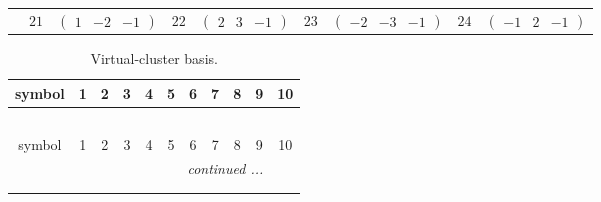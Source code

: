 \documentclass[fleqn,10pt,landscape]{article}
\begin{document}
\begin{itemize}
{\begin{center}
\begin{longtable}{ccccccccc}
& $ 21 $ & $ \begin{pmatrix} 1 & -2 & -1 \end{pmatrix} $ & $ 22 $ & $ \begin{pmatrix} 2 & 3 & -1 \end{pmatrix} $ & $ 23 $ & $ \begin{pmatrix} -2 & -3 & -1 \end{pmatrix} $ & $ 24 $ & $ \begin{pmatrix} -1 & 2 & -1 \end{pmatrix} $ \\
\end{longtable}
\end{center}
\begin{center}
\renewcommand{\arraystretch}{1.7}
\begin{longtable}{ccccccccccc}
\caption{Virtual-cluster basis.}
 \\
 \hline \hline
symbol & 1 & 2 & 3 & 4 & 5 & 6 & 7 & 8 & 9 & 10 \\ \hline \endfirsthead

\multicolumn{10}{l}{\tablename\ \thetable{}} \\
 \hline \hline
symbol & 1 & 2 & 3 & 4 & 5 & 6 & 7 & 8 & 9 & 10 \\ \hline \endhead

 \hline \hline
\multicolumn{10}{r}{\footnotesize\it continued ...} \\ \endfoot

 \hline \hline
\multicolumn{10}{r}{} \\ \endlastfoot


\end{longtable}
\end{center}}
\end{itemize}
\end{document}
